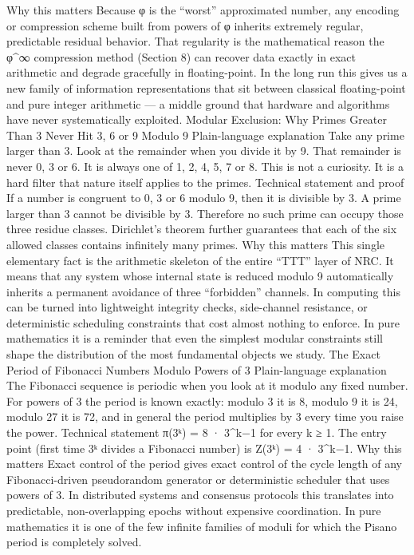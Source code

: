 Why this matters
Because φ is the “worst” approximated number, any encoding or compression scheme built from powers of φ inherits extremely regular, predictable residual behavior. That regularity is the mathematical reason the φ^∞ compression method (Section 8) can recover data exactly in exact arithmetic and degrade gracefully in floating-point. In the long run this gives us a new family of information representations that sit between classical floating-point and pure integer arithmetic — a middle ground that hardware and algorithms have never systematically exploited.
Modular Exclusion: Why Primes Greater Than 3 Never Hit 3, 6 or 9 Modulo 9
Plain-language explanation
Take any prime larger than 3. Look at the remainder when you divide it by 9. That remainder is never 0, 3 or 6. It is always one of 1, 2, 4, 5, 7 or 8.
This is not a curiosity. It is a hard filter that nature itself applies to the primes.
Technical statement and proof
If a number is congruent to 0, 3 or 6 modulo 9, then it is divisible by 3. A prime larger than 3 cannot be divisible by 3. Therefore no such prime can occupy those three residue classes.
Dirichlet’s theorem further guarantees that each of the six allowed classes contains infinitely many primes.
Why this matters
This single elementary fact is the arithmetic skeleton of the entire “TTT” layer of NRC. It means that any system whose internal state is reduced modulo 9 automatically inherits a permanent avoidance of three “forbidden” channels. In computing this can be turned into lightweight integrity checks, side-channel resistance, or deterministic scheduling constraints that cost almost nothing to enforce. In pure mathematics it is a reminder that even the simplest modular constraints still shape the distribution of the most fundamental objects we study.
The Exact Period of Fibonacci Numbers Modulo Powers of 3
Plain-language explanation
The Fibonacci sequence is periodic when you look at it modulo any fixed number. For powers of 3 the period is known exactly: modulo 3 it is 8, modulo 9 it is 24, modulo 27 it is 72, and in general the period multiplies by 3 every time you raise the power.
Technical statement
π(3ᵏ) = 8 · 3^{k−1} for every k ≥ 1.
The entry point (first time 3ᵏ divides a Fibonacci number) is Z(3ᵏ) = 4 · 3^{k−1}.
Why this matters
Exact control of the period gives exact control of the cycle length of any Fibonacci-driven pseudorandom generator or deterministic scheduler that uses powers of 3. In distributed systems and consensus protocols this translates into predictable, non-overlapping epochs without expensive coordination. In pure mathematics it is one of the few infinite families of moduli for which the Pisano period is completely solved.
